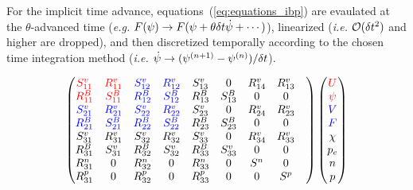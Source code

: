 For the implicit time advance, equations~(\ref{eq:equations_ibp}) are
evaulated at the $\theta$-advanced time (\emph{e.g.} $F(\psi) \to
F(\psi + \theta \delta t \dot{\psi} + \cdots)$), linearized (\emph{i.e.}
$\mathcal{O}(\delta t^2)$ and higher are dropped), and then discretized
temporally according to the chosen time integration method
(\emph{i.e.} $\dot{\psi} \to (\psi^{(n+1)} - \psi^{(n)})/\delta t$).


\begin{eqnarray}
  \begin{pmatrix}
    \textcolor{red}{S^v_{1 1}} & \textcolor{red}{R^v_{1 1}} &
    \textcolor{blue}{S^v_{1 2}} & \textcolor{blue}{R^v_{1 2}} & 
          S^v_{1 3}  &        0         &
          R^v_{1 4}  &       R^v_{1 3}
    \\
    \textcolor{red}{R^B_{1 1}} & \textcolor{red}{S^B_{1 1}} &
    \textcolor{blue}{R^B_{1 2}} & \textcolor{blue}{S^B_{1 2}} & 
          R^B_{1 3}  &       S^B_{1 3}  &
              0      &        0
    \\
    \textcolor{blue}{S^v_{2 1}} & \textcolor{blue}{R^v_{2 1}} & 
    \textcolor{blue}{S^v_{2 2}} & \textcolor{blue}{R^v_{2 2}} & 
          S^v_{2 3}  &        0         &
	  R^v_{2 4}  &       R^v_{2 3}
    \\
    \textcolor{blue}{R^B_{2 1}} & \textcolor{blue}{S^B_{2 1}} &
    \textcolor{blue}{R^B_{2 2}} & \textcolor{blue}{S^B_{2 2}} & 
          R^B_{2 3}  &       S^B_{2 3}  &
              0      &        0
    \\
          S^v_{3 1}  &       R^v_{3 1}  &
          S^v_{3 2}  &       R^v_{3 2}  &
          S^v_{3 3}  &        0         &
	  R^v_{3 4}  &       R^v_{3 3}  
    \\
          R^B_{3 1}  &       S^v_{3 1}  &
          R^B_{3 2}  &       S^v_{3 2}  &
          R^B_{3 3}  &       S^v_{3 3}  &
              0      &        0
    \\
          R^n_{3 1}  &        0         &
          R^n_{3 2}  &        0         &
          R^n_{3 3}  &        0         &
          S^n        &        0
    \\
          R^p_{3 1}  &        0         &
          R^p_{3 2}  &        0         &
          R^p_{3 3}  &        0         &
              0      &       S^p        &
  \end{pmatrix}
  \begin{pmatrix}
    \textcolor{red}{U}\\ \textcolor{red}{\psi}\\ 
    \textcolor{blue}{V}\\ \textcolor{blue}{F}   \\
    \chi \\ p_e \\ 
    n \\ p

\end{pmatrix}
\end{eqnarray}
